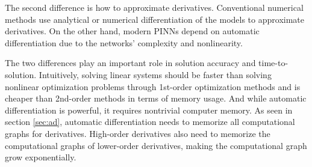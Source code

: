 The second difference is how to approximate derivatives.
Conventional numerical methods use analytical or numerical differentiation of the models to approximate derivatives.
On the other hand, modern PINNs depend on automatic differentiation due to the networks' complexity and nonlinearity.

The two differences play an important role in solution accuracy and time-to-solution.
Intuitively, solving linear systems should be faster than solving nonlinear optimization problems through 1st-order optimization methods and is cheaper than 2nd-order methods in terms of memory usage.
And while automatic differentiation is powerful, it requires nontrivial computer memory.
As seen in section \ref{sec:ad}, automatic differentiation needs to memorize all computational graphs for derivatives.
High-order derivatives also need to memorize the computational graphs of lower-order derivatives, making the computational graph grow exponentially.

